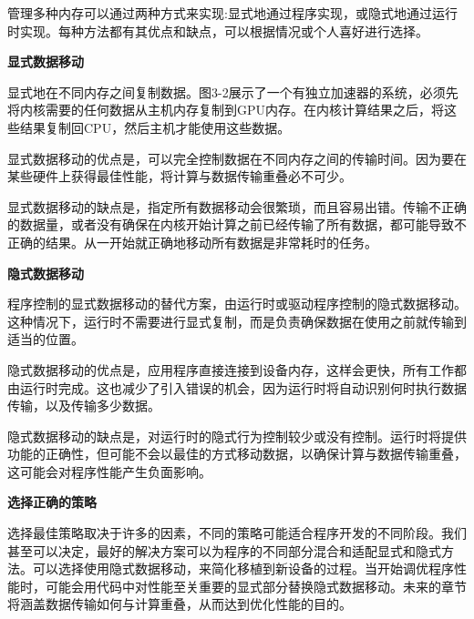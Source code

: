 管理多种内存可以通过两种方式来实现:显式地通过程序实现，或隐式地通过运行时实现。每种方法都有其优点和缺点，可以根据情况或个人喜好进行选择。\par

\hspace*{\fill} \par %
\textbf{显式数据移动}

显式地在不同内存之间复制数据。图3-2展示了一个有独立加速器的系统，必须先将内核需要的任何数据从主机内存复制到GPU内存。在内核计算结果之后，将这些结果复制回CPU，然后主机才能使用这些数据。\par

显式数据移动的优点是，可以完全控制数据在不同内存之间的传输时间。因为要在某些硬件上获得最佳性能，将计算与数据传输重叠必不可少。\par

显式数据移动的缺点是，指定所有数据移动会很繁琐，而且容易出错。传输不正确的数据量，或者没有确保在内核开始计算之前已经传输了所有数据，都可能导致不正确的结果。从一开始就正确地移动所有数据是非常耗时的任务。\par

\hspace*{\fill} \par %
\textbf{隐式数据移动}

程序控制的显式数据移动的替代方案，由运行时或驱动程序控制的隐式数据移动。这种情况下，运行时不需要进行显式复制，而是负责确保数据在使用之前就传输到适当的位置。\par

隐式数据移动的优点是，应用程序直接连接到设备内存，这样会更快，所有工作都由运行时完成。这也减少了引入错误的机会，因为运行时将自动识别何时执行数据传输，以及传输多少数据。\par

隐式数据移动的缺点是，对运行时的隐式行为控制较少或没有控制。运行时将提供功能的正确性，但可能不会以最佳的方式移动数据，以确保计算与数据传输重叠，这可能会对程序性能产生负面影响。\par

\hspace*{\fill} \par %
\textbf{选择正确的策略}

选择最佳策略取决于许多的因素，不同的策略可能适合程序开发的不同阶段。我们甚至可以决定，最好的解决方案可以为程序的不同部分混合和适配显式和隐式方法。可以选择使用隐式数据移动，来简化移植到新设备的过程。当开始调优程序性能时，可能会用代码中对性能至关重要的显式部分替换隐式数据移动。未来的章节将涵盖数据传输如何与计算重叠，从而达到优化性能的目的。\par
















